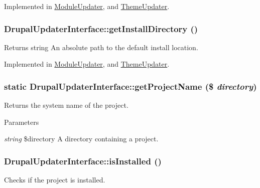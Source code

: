 Implemented in \hyperlink{classModuleUpdater_a7bd09734a00297f3c1802d8eece33ed7}{ModuleUpdater}, and \hyperlink{classThemeUpdater_a5a7a2a58d90d97545d32a41af99a6afc}{ThemeUpdater}.\hypertarget{interfaceDrupalUpdaterInterface_a2d619c7d5c0e869f13651543587419f1}{
\subsubsection[{getInstallDirectory}]{\setlength{\rightskip}{0pt plus 5cm}DrupalUpdaterInterface::getInstallDirectory ()}}
\label{interfaceDrupalUpdaterInterface_a2d619c7d5c0e869f13651543587419f1}
\begin{DoxyReturn}{Returns}
string An absolute path to the default install location. 
\end{DoxyReturn}


Implemented in \hyperlink{classModuleUpdater_a8c7efff0795d79e256cab15be533800d}{ModuleUpdater}, and \hyperlink{classThemeUpdater_a3c3305b406350c7e0c9cca377e5b50d6}{ThemeUpdater}.\hypertarget{interfaceDrupalUpdaterInterface_ae60c2f028890fd7f9d5831f9058c9b33}{
\subsubsection[{getProjectName}]{\setlength{\rightskip}{0pt plus 5cm}static DrupalUpdaterInterface::getProjectName (\$ {\em directory})}}
\label{interfaceDrupalUpdaterInterface_ae60c2f028890fd7f9d5831f9058c9b33}
Returns the system name of the project.


\begin{DoxyParams}{Parameters}
\item[{\em string}]\$directory A directory containing a project. \end{DoxyParams}
\hypertarget{interfaceDrupalUpdaterInterface_af4e78762c89a91a4a2a7dd2fb325f214}{
\subsubsection[{isInstalled}]{\setlength{\rightskip}{0pt plus 5cm}DrupalUpdaterInterface::isInstalled ()}}
\label{interfaceDrupalUpdaterInterface_af4e78762c89a91a4a2a7dd2fb325f214}
Checks if the project is installed.

